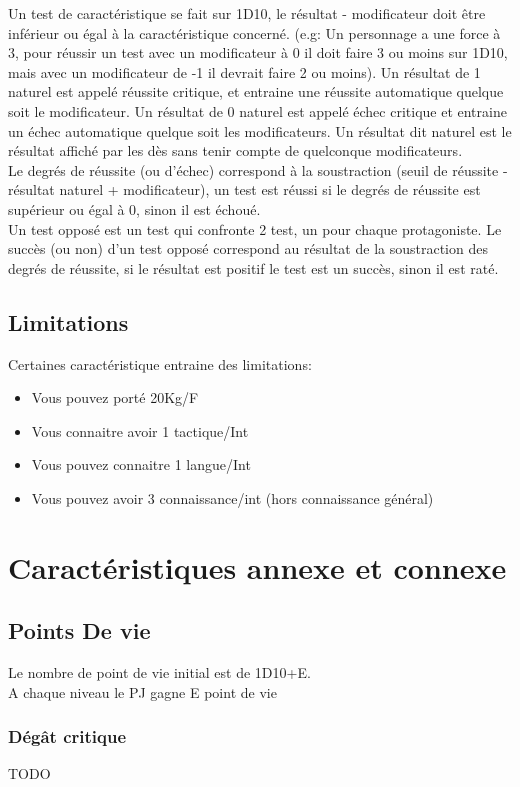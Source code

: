 Un test de caractéristique se fait sur 1D10, le résultat - modificateur doit être inférieur ou égal à la caractéristique concerné. (e.g: Un personnage a une force à 3, pour réussir un test avec un modificateur à 0  il doit faire 3 ou moins sur 1D10, mais avec un modificateur de -1 il devrait faire 2 ou moins). Un résultat de 1 naturel est appelé réussite critique, et entraine une réussite automatique quelque soit le modificateur. Un résultat de 0 naturel est appelé échec critique et entraine un échec automatique quelque soit les modificateurs. Un résultat dit naturel est le résultat affiché par les dès sans tenir compte de quelconque modificateurs.\\
Le degrés de réussite (ou d'échec) correspond à la soustraction (seuil de réussite - résultat naturel + modificateur), un test est réussi si le degrés de réussite est supérieur ou égal à 0, sinon il est échoué.\\
Un test opposé est un test qui confronte 2 test, un pour chaque protagoniste. Le succès (ou non) d'un test opposé correspond au résultat de la soustraction des degrés de réussite, si le résultat est positif le test est un succès, sinon il est raté.

\subsection*{Limitations}
Certaines caractéristique entraine des limitations:
\begin{itemize}
\item Vous pouvez porté 20Kg/F
\item Vous connaitre avoir 1 tactique/Int
\item Vous pouvez connaitre 1 langue/Int
\item Vous pouvez avoir 3 connaissance/int (hors connaissance général)
\end{itemize}
\section{Caractéristiques annexe et connexe}
\subsection{Points De vie}
Le nombre de point de vie initial est de 1D10+E. \\
A chaque niveau le PJ gagne E point de vie 
\subsubsection{Dégât critique}
TODO
